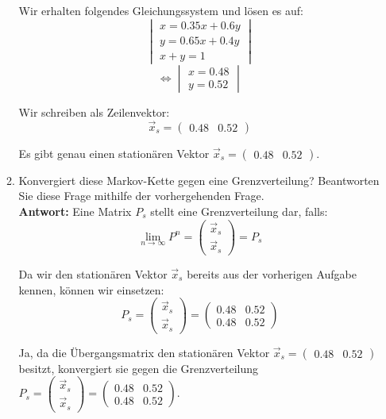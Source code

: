 \documentclass[12pt,a4paper]{article}
\begin{document}
\begin{enumerate}
\begin{enumerate}
Wir erhalten folgendes Gleichungssystem und lösen es auf:
$$\begin{vmatrix}
 x = 0.35x + 0.6y\\
 y = 0.65x + 0.4y\\
 x + y = 1
\end{vmatrix}$$
$$\Leftrightarrow \begin{vmatrix}
 x = 0.48\\
 y = 0.52
\end{vmatrix}$$

Wir schreiben als Zeilenvektor:
$$\vec x_s = \begin{pmatrix}
 0.48 & 0.52
\end{pmatrix}$$

Es gibt genau einen stationären Vektor $\vec x_s = \begin{pmatrix} 0.48 & 0.52 \end{pmatrix}$.

\item Konvergiert diese Markov-Kette gegen eine Grenzverteilung? Beantworten Sie diese Frage mithilfe der vorhergehenden Frage.\\
\textbf{Antwort:} Eine Matrix $P_s$ stellt eine Grenzverteilung dar, falls:
$$\lim_{n \to \infty} P^n = \begin{pmatrix}
 \vec x_s\\
 \vec x_s
\end{pmatrix} = P_s$$

Da wir den stationären Vektor $\vec x_s$ bereits aus der vorherigen Aufgabe kennen, können wir einsetzen:
$$P_s = \begin{pmatrix}
 \vec x_s\\
 \vec x_s
\end{pmatrix} = \begin{pmatrix}
 0.48 & 0.52\\
 0.48 & 0.52
\end{pmatrix}$$

Ja, da die Übergangsmatrix den stationären Vektor $\vec x_s = \begin{pmatrix} 0.48 & 0.52 \end{pmatrix}$ besitzt, konvergiert sie gegen die Grenzverteilung $P_s = \begin{pmatrix}
 \vec x_s\\
 \vec x_s
\end{pmatrix} = \begin{pmatrix}
 0.48 & 0.52\\
 0.48 & 0.52
\end{pmatrix}$.


\end{enumerate}
\end{enumerate}
\end{document}
